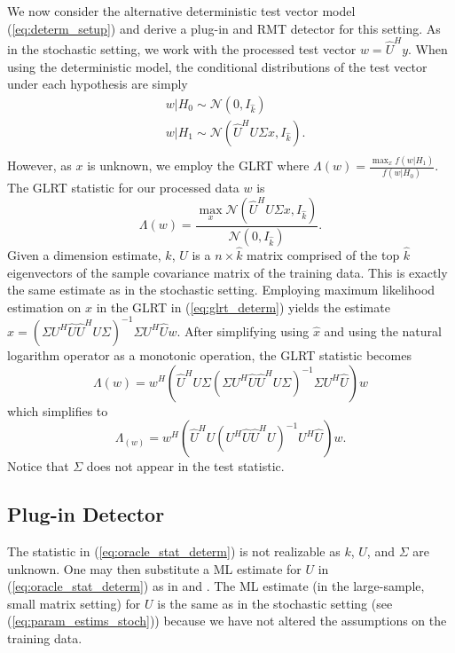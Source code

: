 We now consider the alternative deterministic test vector model (\ref{eq:determ_setup}) and derive a plug-in and RMT detector for this setting. As in the stochastic setting, we work with the processed test vector $w=\widehat{U}^{H}y$. When using the deterministic model, the conditional distributions of the test vector under each hypothesis are simply
\begin{equation*}
\begin{aligned}
&w|H_0\sim\mathcal{N}(0,I_{\widehat{k}})\\
&w|H_1\sim\mathcal{N}(\widehat{U}^HU\Sigma x, I_{\widehat{k}}).\\
\end{aligned}
\end{equation*}
However, as $x$ is unknown, we employ the GLRT where $\Lambda(w) = \frac{\max_x f(w|H_1)}{f(w|H_0)}$. The GLRT statistic for our processed data $w$ is
\begin{equation}\label{eq:glrt_determ}
\Lambda(w)=\frac{\max_x\mathcal{N}(\widehat{U}^HU\Sigma x,I_{\widehat{k}})}{\mathcal{N}(0,I_{\widehat{k}})}.
\end{equation}
Given a dimension estimate, $\widehat{k}$, $\widehat{U}$ is a $n\times\widehat{k}$ matrix comprised of the top $\widehat{k}$ eigenvectors of the sample covariance matrix of the training data. This is exactly the same estimate as in the stochastic setting. Employing maximum likelihood estimation on $x$ in the GLRT in (\ref{eq:glrt_determ}) yields the estimate $\widehat{x}=\left(\Sigma U^H\widehat{U}\widehat{U}^HU\Sigma\right)^{-1}\Sigma U^H\widehat{U}w$. After simplifying using $\widehat{x}$ and using the natural logarithm operator as a monotonic operation, the GLRT statistic becomes
\begin{equation*}
\Lambda(w) = w^H\left(\widehat{U}^HU\Sigma\left(\Sigma U^H\widehat{U}\widehat{U}^HU\Sigma\right)^{-1}\Sigma U^H\widehat{U}\right)w
\end{equation*}
which simplifies to
\begin{equation}\label{eq:oracle_stat_determ}
\Lambda_(w) = w^H\left(\widehat{U}^HU\left(U^H\widehat{U}\widehat{U}^HU\right)^{-1} U^H\widehat{U}\right)w.
\end{equation}
Notice that $\Sigma$ does not appear in the test statistic.

\subsection{Plug-in Detector}\label{sec:plugin_determ}
The statistic in (\ref{eq:oracle_stat_determ}) is not realizable as $k$, $U$, and $\Sigma$ are unknown. One may then substitute a ML estimate for $U$ in (\ref{eq:oracle_stat_determ}) as in \cite{jin2005cfar} and \cite{mcwhorter2003matched}. The ML estimate (in the large-sample, small matrix setting) for $U$ is the same as in the stochastic setting (see (\ref{eq:param_estims_stoch})) because we have not altered the assumptions on the training data.

